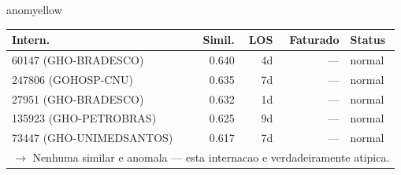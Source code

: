 \documentclass[a4paper,10pt]{article}
\begin{document}
\begin{anomalycard}[Internacao 167178 | GHO-PETROBRAS | MODERADO (z=2.51)]{anomyellow}
\begin{tabular}{l r r r l}\toprule\textbf{Intern.} & \textbf{Simil.} & \textbf{LOS} & \textbf{Faturado} & \textbf{Status} \\\midrule
60147 (GHO-BRADESCO) & 0.640 & 4d & --- & \textcolor{jcubeblue}{normal} \\
247806 (GOHOSP-CNU) & 0.635 & 7d & --- & \textcolor{jcubeblue}{normal} \\
27951 (GHO-BRADESCO) & 0.632 & 1d & --- & \textcolor{jcubeblue}{normal} \\
135923 (GHO-PETROBRAS) & 0.625 & 9d & --- & \textcolor{jcubeblue}{normal} \\
73447 (GHO-UNIMEDSANTOS) & 0.617 & 7d & --- & \textcolor{jcubeblue}{normal} \\
\multicolumn{5}{l}{\textcolor{jcubeblue}{\small $\rightarrow$ Nenhuma similar e anomala --- esta internacao e verdadeiramente atipica.}} \\
\bottomrule\end{tabular}


\end{anomalycard}

\newpage
\end{document}
